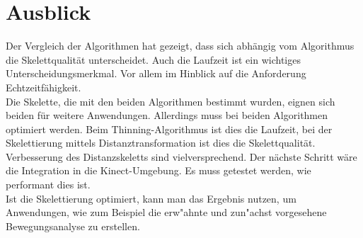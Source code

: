 \section{Ausblick}
Der Vergleich der Algorithmen hat gezeigt, dass sich abhängig vom Algorithmus die Skelettqualität unterscheidet. Auch die 
Laufzeit ist ein wichtiges Unterscheidungsmerkmal. Vor allem im Hinblick auf die Anforderung Echtzeitfähigkeit.\\
Die Skelette, die mit den beiden Algorithmen bestimmt wurden, eignen sich beiden für weitere Anwendungen. Allerdings muss bei beiden Algorithmen optimiert werden. Beim Thinning-Algorithmus ist dies die Laufzeit, bei der Skelettierung mittels Distanztransformation ist dies die Skelettqualität. Verbesserung des Distanzskeletts sind vielversprechend. Der nächste Schritt wäre die Integration in die Kinect-Umgebung. Es muss
getestet werden, wie performant dies ist. \\ Ist die Skelettierung optimiert, kann man das Ergebnis nutzen, um Anwendungen, wie zum Beispiel die erw"ahnte und zun"achst vorgesehene Bewegungsanalyse zu erstellen.